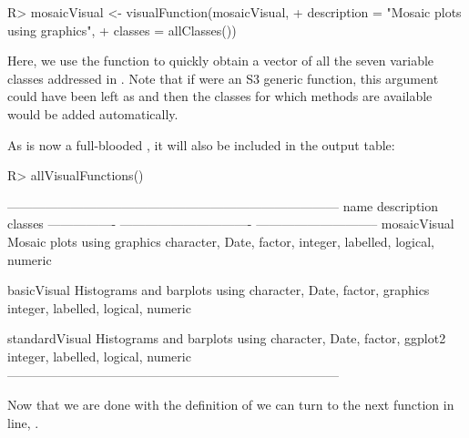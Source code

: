 \documentclass[article,shortnames]{jss}
\newcommand{\hl}[1]{\textcolor{magenta}{#1}}
\begin{document}
\begin{Schunk}
\begin{Sinput}
R> mosaicVisual <- visualFunction(mosaicVisual,
+    description = "Mosaic plots using graphics",
+    classes = allClasses())
\end{Sinput}
\end{Schunk}

Here, we use the function  to quickly obtain a vector
of all the seven variable classes addressed in . Note that
if  were an S3 generic function, this argument could
have been left as  and then the classes for which methods are
available would be added automatically.

As  is now a full-blooded , it
will also be included in the  output table:
\begin{Schunk}
\begin{Sinput}
R> allVisualFunctions()
\end{Sinput}
\begin{Soutput}
------------------------------------------------------------------------------
name             description                     classes                      
---------------- ------------------------------- -----------------------------
mosaicVisual     Mosaic plots using graphics     character, Date, factor,     
                                                 integer, labelled, logical,  
                                                 numeric                      

basicVisual      Histograms and barplots using   character, Date, factor,     
                 graphics                        integer, labelled, logical,  
                                                 numeric                      

standardVisual   Histograms and barplots using   character, Date, factor,     
                 ggplot2                         integer, labelled, logical,  
                                                 numeric                      
------------------------------------------------------------------------------
\end{Soutput}
\end{Schunk}

Now that we are done with the definition of  we can
turn to the next function in line, .
\end{document}
